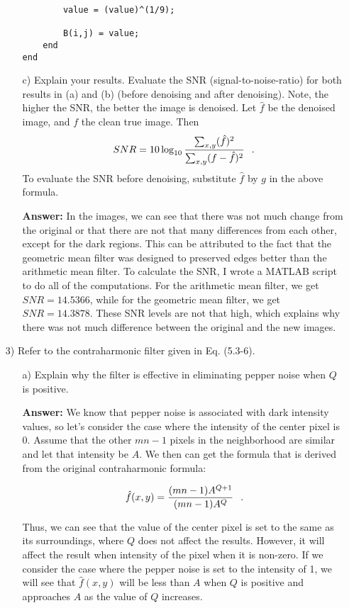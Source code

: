 \documentclass{article}
\begin{document}
\begin{enumerate}
\begin{enumerate}
\begin{lstlisting}
        value = (value)^(1/9);
        
        B(i,j) = value;
    end
end

\end{lstlisting}

\item[c)] Explain your results. Evaluate the SNR (signal-to-noise-ratio) for both results in (a) and (b) (before denoising and after denoising). Note, the higher the SNR, the better 
the image is denoised. Let $\hat f$ be the denoised image, and $f$ the clean true image. Then $$SNR=10\log_{10}\frac{\sum_{x,y}(\hat f)^2}{\sum_{x,y}(f-\hat f)^2} \hspace{0.1in} .$$
To evaluate the SNR before denoising, substitute $\hat f$ by $g$ in the above formula. 

\textbf{Answer: }In the images, we can see that there was not much change from the original or that there are not that many differences from each other, except for the dark regions.  This can
be attributed to the fact that the geometric mean filter was designed to preserved edges better than the arithmetic mean filter. \newline To calculate the SNR, I wrote a MATLAB script to do all of
the computations. For the arithmetic mean filter, we get $SNR = 14.5366$, while for the geometric mean filter, we get $SNR = 14.3878$.  These SNR levels are not that high, which explains why there
was not much difference between the original and the new images.
\end{enumerate}

\newpage
\item[3)] Refer to the contraharmonic filter given in Eq. (5.3-6).

\begin{enumerate}
\item[a)] Explain why the filter is effective in eliminating pepper noise when $Q$ is positive. 

\textbf{Answer: }We know that pepper noise is associated with dark intensity values, so let's consider the case where the intensity of the center pixel is 0. Assume that the other $mn - 1$ pixels
in the neighborhood are similar and let that intensity be $A$. We then can get the formula that is derived from the original contraharmonic formula:

$$\hat f (x,y) = \frac{(mn - 1) A^{Q+1}}{(mn - 1) A^Q} \hspace{0.1in} .$$

Thus, we can see that the value of the center pixel is set to the same as its surroundings, where $Q$ does not affect the results. However, it will affect the result when intensity of the pixel when it is
non-zero. If we consider the case where the pepper noise is set to the intensity of 1, we will see that $\hat f (x,y)$ will be less than $A$ when $Q$ is positive and approaches $A$ as the value of $Q$
increases.


\end{enumerate}
\end{enumerate}
\end{document}
